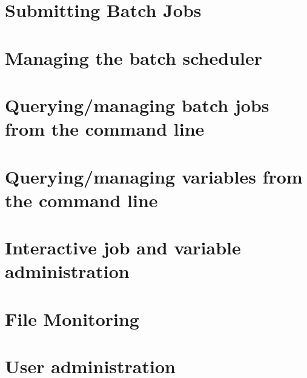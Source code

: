 \section{Submitting Batch Jobs}




\section{Managing the batch scheduler}








\section{Querying/managing batch jobs from the command line}






\section{Querying/managing variables from the command line}


\section{Interactive job and variable administration}


\section{File Monitoring}


\section{User administration}





